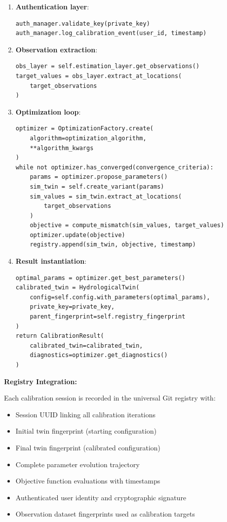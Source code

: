 \begin{enumerate}
    \item \textbf{Authentication layer}:
    \begin{verbatim}
auth_manager.validate_key(private_key)
auth_manager.log_calibration_event(user_id, timestamp)
    \end{verbatim}

    \item \textbf{Observation extraction}:
    \begin{verbatim}
obs_layer = self.estimation_layer.get_observations()
target_values = obs_layer.extract_at_locations(
    target_observations
)
    \end{verbatim}

    \item \textbf{Optimization loop}:
    \begin{verbatim}
optimizer = OptimizationFactory.create(
    algorithm=optimization_algorithm,
    **algorithm_kwargs
)
while not optimizer.has_converged(convergence_criteria):
    params = optimizer.propose_parameters()
    sim_twin = self.create_variant(params)
    sim_values = sim_twin.extract_at_locations(
        target_observations
    )
    objective = compute_mismatch(sim_values, target_values)
    optimizer.update(objective)
    registry.append(sim_twin, objective, timestamp)
    \end{verbatim}

    \item \textbf{Result instantiation}:
    \begin{verbatim}
optimal_params = optimizer.get_best_parameters()
calibrated_twin = HydrologicalTwin(
    config=self.config.with_parameters(optimal_params),
    private_key=private_key,
    parent_fingerprint=self.registry_fingerprint
)
return CalibrationResult(
    calibrated_twin=calibrated_twin,
    diagnostics=optimizer.get_diagnostics()
)
    \end{verbatim}
\end{enumerate}

\textbf{Registry Integration:}

Each calibration session is recorded in the universal Git registry with:
\begin{itemize}
    \item Session UUID linking all calibration iterations
    \item Initial twin fingerprint (starting configuration)
    \item Final twin fingerprint (calibrated configuration)
    \item Complete parameter evolution trajectory
    \item Objective function evaluations with timestamps
    \item Authenticated user identity and cryptographic signature
    \item Observation dataset fingerprints used as calibration targets
\end{itemize}

